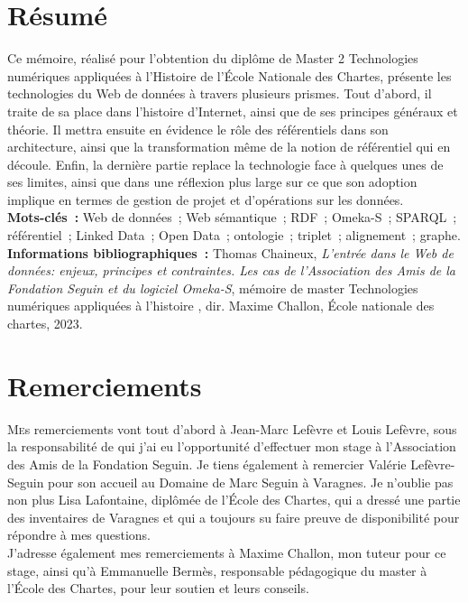 \documentclass[a4paper,12pt,twoside]{book}
\begin{document}
	\chapter{Résumé}
	\medskip
Ce mémoire, réalisé pour l'obtention du diplôme de Master 2 \og Technologies numériques appliquées à l'Histoire \fg{} de l'École Nationale des Chartes, présente les technologies du Web de données à travers plusieurs prismes. Tout d'abord, il traite de sa place dans l'histoire d'Internet, ainsi que de ses principes généraux et théorie. Il mettra ensuite en évidence le rôle des référentiels dans son architecture, ainsi que la transformation même de la notion de \og référentiel \fg{} qui en découle. Enfin, la dernière partie replace la technologie face à quelques unes de ses limites, ainsi que dans une réflexion plus large sur ce que son adoption implique en termes de gestion de projet et d'opérations sur les données. \\

	\textbf{Mots-clés~:} Web de données~; Web sémantique~; RDF~; Omeka-S~; SPARQL~; référentiel~; Linked Data~; Open Data~; ontologie~; triplet~; alignement~; graphe. \\
	
	\textbf{Informations bibliographiques~:} Thomas Chaineux, \textit{L'entrée dans le Web de données: enjeux, principes et contraintes. Les cas de l'Association des Amis de la Fondation Seguin et du logiciel Omeka-S}, mémoire de master \og {}Technologies numériques appliquées à l'histoire \fg{}{}, dir. Maxime Challon, École nationale des chartes, 2023.
	
		\newpage{\pagestyle{empty}\cleardoublepage}
	
	\chapter{Remerciements}
	
	\lettrine{M}es remerciements vont tout d'abord à Jean-Marc Lefèvre et Louis Lefèvre, sous la responsabilité de qui j'ai eu l'opportunité d'effectuer mon stage à l'Association des Amis de la Fondation Seguin. Je tiens également à remercier Valérie Lefèvre-Seguin pour son accueil au Domaine de Marc Seguin à Varagnes. Je n'oublie pas non plus Lisa Lafontaine, diplômée de l'École des Chartes, qui a dressé une partie des inventaires de Varagnes et qui a toujours su faire preuve de disponibilité pour répondre à mes questions.\\

 J'adresse également mes remerciements à Maxime Challon, mon tuteur pour ce stage, ainsi qu'à Emmanuelle Bermès, responsable pédagogique du master à l'École des Chartes, pour leur soutien et leurs conseils.\\
\end{document}
